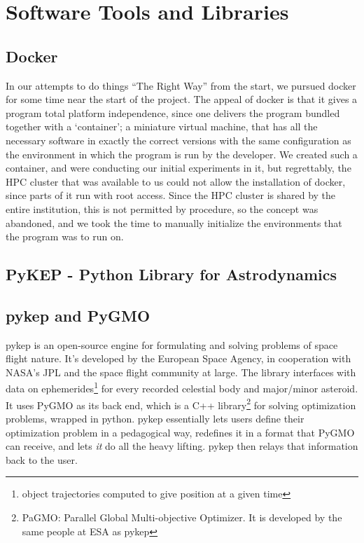 \chapter{Software Tools and Libraries} \label{apx:software}

\section{Docker}

In our attempts to do things ``The Right Way'' from the start, we pursued docker for some time near the start of the project. The appeal of docker is that it gives a program total platform independence, since one delivers the program bundled together with a `container'; a miniature virtual machine, that has all the necessary software in exactly the correct versions with the same configuration as the environment in which the program is run by the developer. We created such a container, and were conducting our initial experiments in it, but regrettably, the HPC cluster that was available to us could not allow the installation of docker, since parts of it run with root access. Since the HPC cluster is shared by the entire institution, this is not permitted by procedure, so the concept was abandoned, and we took the time to manually initialize the environments that the program was to run on.


\section{PyKEP - Python Library for Astrodynamics}

\section{pykep and PyGMO}

pykep is an open-source engine for formulating and solving problems of space flight nature. It's developed by the European Space Agency, in cooperation with NASA's JPL and the space flight community at large. The library interfaces with data on ephemerides\footnote{object trajectories computed to give position at a given time} for every recorded celestial body and major/minor asteroid. It uses PyGMO as its back end, which is a C++ library\footnote{PaGMO: Parallel Global Multi-objective Optimizer. It is developed by the same people at ESA as pykep} for solving optimization problems, wrapped in python. pykep essentially lets users define their optimization problem in a pedagogical way, redefines it in a format that PyGMO can receive, and lets \emph{it} do all the heavy lifting. pykep then relays that information back to the user.

